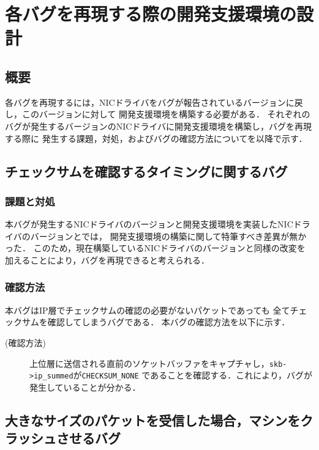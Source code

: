 \documentclass[12pt]{jsarticle}
\begin{document}
\section{各バグを再現する際の開発支援環境の設計}
\subsection{概要}
各バグを再現するには，NICドライバをバグが報告されているバージョンに戻し，このバージョンに対して
開発支援環境を構築する必要がある．
それぞれのバグが発生するバージョンのNICドライバに開発支援環境を構築し，バグを再現する際に
発生する課題，対処，およびバグの確認方法についてを以降で示す．

\subsection{チェックサムを確認するタイミングに関するバグ}
\subsubsection{課題と対処}
本バグが発生するNICドライバのバージョンと開発支援環境を実装したNICドライバのバージョンとでは，
開発支援環境の構築に関して特筆すべき差異が無かった．
このため，現在構築しているNICドライバのバージョンと同様の改変を加えることにより，バグを再現できると考えられる．

\subsubsection{確認方法}
本バグはIP層でチェックサムの確認の必要がないパケットであっても
全てチェックサムを確認してしまうバグである．
本バグの確認方法を以下に示す．
\begin{description}
    \item[(確認方法)]上位層に送信される直前のソケットバッファをキャプチャし，{\tt skb->ip\_summed}が{\tt CHECKSUM\_NONE}
        であることを確認する．これにより，バグが発生していることが分かる．
\end{description}

\subsection{大きなサイズのパケットを受信した場合，マシンをクラッシュさせるバグ}
\end{document}
